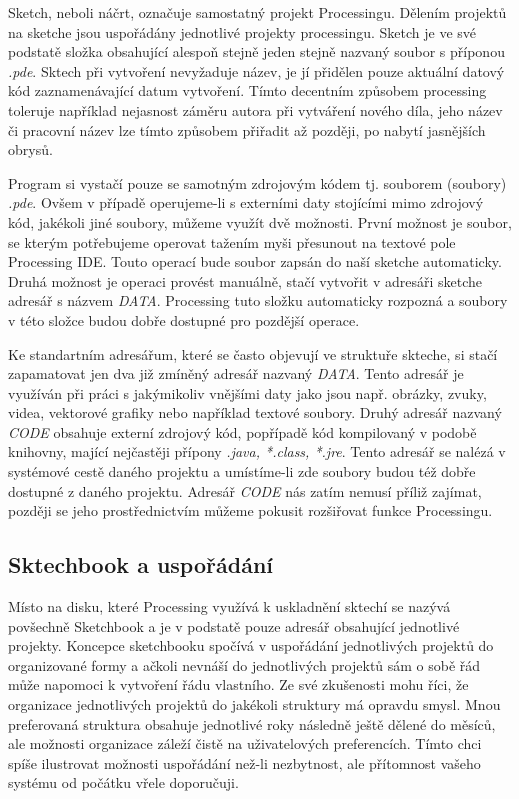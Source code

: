 \documentclass[11pt]{article} %
\begin{document}
Sketch, neboli náčrt, označuje samostatný projekt Processingu. Dělením projektů na sketche jsou uspořádány jednotlivé projekty processingu. Sketch je ve své podstatě složka obsahující alespoň stejně jeden stejně nazvaný soubor s příponou {\em *.pde}. Sktech při vytvoření nevyžaduje název, je jí přidělen pouze aktuální datový kód zaznamenávající datum vytvoření. Tímto decentním způsobem processing toleruje například nejasnost záměru autora při vytváření nového díla, jeho název či pracovní název lze tímto způsobem přiřadit až později, po nabytí jasnějších obrysů.

Program si vystačí pouze se samotným zdrojovým kódem tj. souborem (soubory) {\em *.pde}. Ovšem v případě operujeme-li s externími daty stojícími mimo zdrojový kód, jakékoli jiné soubory, můžeme využít dvě možnosti. První možnost je soubor, se kterým potřebujeme operovat tažením myši přesunout na textové pole Processing IDE. Touto operací bude soubor zapsán do naší sketche automaticky. Druhá možnost je operaci provést manuálně, stačí vytvořit v adresáři sketche adresář s názvem {\em DATA}. Processing tuto složku automaticky rozpozná a soubory v této složce budou dobře dostupné pro pozdější operace.

Ke standartním adresářum, které se často objevují ve struktuře skteche, si stačí zapamatovat jen dva již zmíněný adresář nazvaný {\em DATA}. Tento adresář je využíván při práci s jakýmikoliv vnějšími daty jako jsou např. obrázky, zvuky, videa, vektorové grafiky nebo například textové soubory. Druhý adresář nazvaný {\em CODE} obsahuje externí zdrojový kód, popřípadě kód kompilovaný v podobě knihovny, mající nejčastěji přípony {\em *.java, *.class, *.jre}. Tento adresář se nalézá v systémové cestě daného projektu a umístíme-li zde soubory budou též dobře dostupné z daného projektu. Adresář {\em CODE} nás zatím nemusí příliž zajímat, později se jeho prostřednictvím můžeme pokusit rozšiřovat funkce Processingu.

\subsection{Sktechbook a uspořádání}

Místo na disku, které Processing využívá k uskladnění sktechí se nazývá povšechně Sketchbook a je v podstatě pouze adresář obsahující jednotlivé projekty. Koncepce sketchbooku spočívá v uspořádání jednotlivých projektů do organizované formy a ačkoli nevnáší do jednotlivých projektů sám o sobě řád může napomoci k vytvoření řádu vlastního. Ze své zkušenosti mohu říci, že organizace jednotlivých projektů do jakékoli struktury má opravdu smysl. Mnou preferovaná struktura obsahuje jednotlivé roky následně ještě dělené do měsíců, ale možnosti organizace záleží čistě na uživatelových preferencích. Tímto chci spíše ilustrovat možnosti uspořádání než-li nezbytnost, ale přítomnost vašeho systému od počátku vřele doporučuji.
\end{document}
